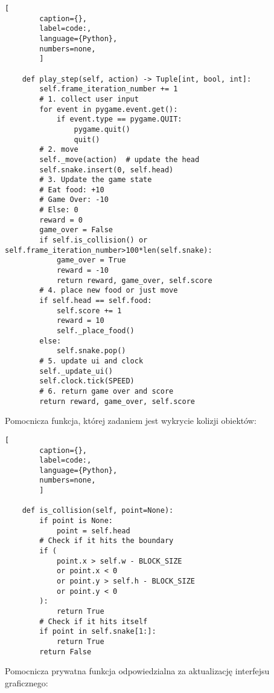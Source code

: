 \begin{onepage}
    \begin{lstlisting}[
        caption={},
        label=code:,
        language={Python},
        numbers=none,
        ]

    def play_step(self, action) -> Tuple[int, bool, int]:
        self.frame_iteration_number += 1
        # 1. collect user input
        for event in pygame.event.get():
            if event.type == pygame.QUIT:
                pygame.quit()
                quit()
        # 2. move
        self._move(action)  # update the head
        self.snake.insert(0, self.head)
        # 3. Update the game state
        # Eat food: +10
        # Game Over: -10
        # Else: 0
        reward = 0
        game_over = False
        if self.is_collision() or self.frame_iteration_number>100*len(self.snake):
            game_over = True
            reward = -10
            return reward, game_over, self.score
        # 4. place new food or just move
        if self.head == self.food:
            self.score += 1
            reward = 10
            self._place_food()
        else:
            self.snake.pop()
        # 5. update ui and clock
        self._update_ui()
        self.clock.tick(SPEED)
        # 6. return game over and score
        return reward, game_over, self.score
    \end{lstlisting}
\end{onepage}

\clearpage

Pomocnicza funkcja, której zadaniem jest wykrycie kolizji obiektów:


\begin{onepage}
    \begin{lstlisting}[
        caption={},
        label=code:,
        language={Python},
        numbers=none,
        ]

    def is_collision(self, point=None):
        if point is None:
            point = self.head
        # Check if it hits the boundary
        if (
            point.x > self.w - BLOCK_SIZE
            or point.x < 0
            or point.y > self.h - BLOCK_SIZE
            or point.y < 0
        ):
            return True
        # Check if it hits itself
        if point in self.snake[1:]:
            return True
        return False
    \end{lstlisting}
\end{onepage}

Pomocnicza prywatna funkcja odpowiedzialna za aktualizację interfejsu graficznego:

